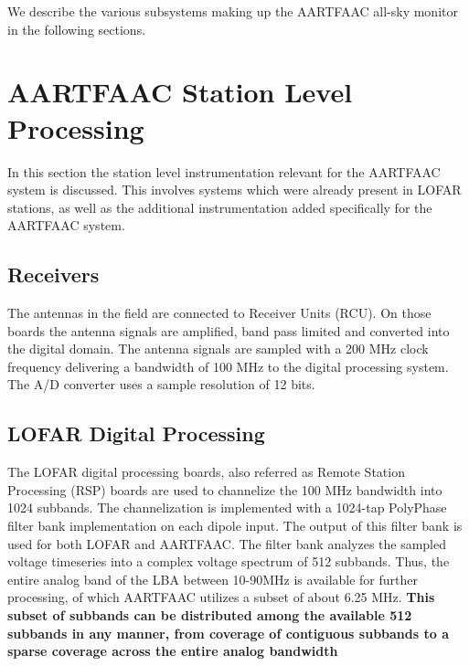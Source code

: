 \documentclass{ws-jai}
\begin{document}
We describe the various subsystems making up the AARTFAAC all-sky monitor in the
following sections.

\section {\label{sec:station_hardware} AARTFAAC Station Level Processing}
In  this section  the station  level instrumentation  relevant for  the AARTFAAC
system is discussed.  This involves systems which were already  present in LOFAR
stations, as well  as the additional instrumentation added  specifically for the
AARTFAAC system.
\subsection {Receivers}  The  antennas  in the  field  are connected  to
Receiver Units  (RCU). On those boards  the antenna signals are  amplified, band
pass limited  and converted into  the digital  domain.  The antenna  signals are
sampled with a 200 MHz clock frequency  delivering a bandwidth of 100 MHz to the
digital processing  system. The  A/D converter  uses a  sample resolution  of 12
bits.

\subsection  {LOFAR Digital  Processing}  The  LOFAR digital  processing
boards, also  referred as  Remote Station  Processing (RSP)  boards are  used to
channelize  the 100  MHz bandwidth  into 1024  subbands.  The  channelization is
implemented with a 1024-tap PolyPhase  filter bank implementation on each dipole
input. The output of  this filter bank is used for both  LOFAR and AARTFAAC. The
filter  bank analyzes  the sampled  voltage  timeseries into  a complex  voltage
spectrum  of 512  subbands. Thus,  the  entire analog  band of  the LBA  between
10-90MHz  is available  for further  processing,  of which  AARTFAAC utilizes  a
subset of about  6.25 MHz.  \textbf {This subset of  subbands can be distributed
  among the  available 512 subbands in  any manner, from coverage  of contiguous
  subbands to a sparse coverage across the entire analog bandwidth}
\end{document}
